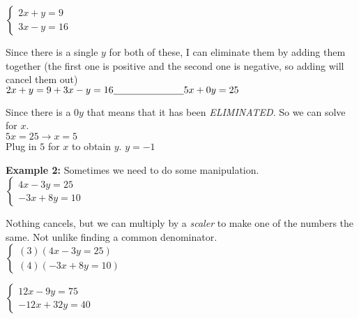 \documentclass[11pt]{article}
\begin{document}
$\begin{cases}
	2x+y=9\\
	3x-y=16
\end{cases}$

\vspace{.2in}

Since there is a single $y$ for both of these, I can eliminate them by adding them together (the first one is positive and the second one is negative, so adding will cancel them out)\\


$
	2x+y=9\\
	+\\	
	3x-y=16\\
\underline{\hspace{1in}}\\
	5x+0y=25
$ 

Since there is a $0y$ that means that it has been \textit{ELIMINATED}. So we can solve for $x$.\\

$5x=25 \rightarrow x=5$\\

Plug in $5$ for $x$ to obtain $y$. $y=-1$

\hrulefill

\textbf{Example 2:} Sometimes we need to do some manipulation.\\

$\begin{cases}
	4x-3y=25\\
	-3x+8y=10
\end{cases}$

\vspace{.2in}

Nothing cancels, but we can multiply by a \textit{scaler} to make one of the numbers the same. Not unlike finding a common denominator.\\

$\begin{cases}
	(3)(4x-3y=25)\\
	(4)(-3x+8y=10)
\end{cases}$

\vspace{.2in}

$\begin{cases}
	12x-9y=75\\
	-12x+32y=40
\end{cases}$

\vspace{.2in}
\end{document}
